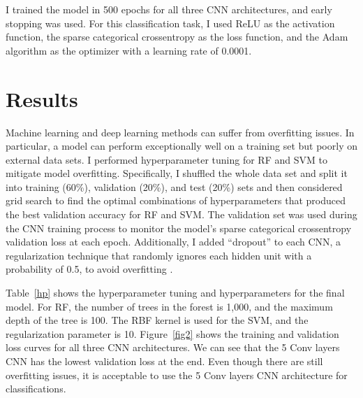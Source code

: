 \documentclass[letterpaper]{article} %
\begin{document}
I trained the model in 500 epochs for all three CNN architectures, and early stopping was used. For this classification task, I used ReLU as the activation function, the sparse categorical crossentropy as the loss function, and the Adam algorithm as the optimizer with a learning rate of 0.0001. 


\begin{table}[t]
\centering
{}
\caption{Hyperparameters tuning for random forest and support vector machine and hyperparameters for the final models}
\label{hp}
\end{table}

\section{Results}

Machine learning and deep learning methods can suffer from overfitting issues. In particular, a model can perform exceptionally well on a training set but poorly on external data sets. I performed hyperparameter tuning for RF and SVM to mitigate model overfitting. Specifically, I shuffled the whole data set and split it into training (60\%), validation (20\%), and test (20\%) sets and then considered grid search to find the optimal combinations of hyperparameters that produced the best validation accuracy for RF and SVM. The validation set was used during the CNN training process to monitor the model's sparse categorical crossentropy validation loss at each epoch. Additionally, I added ``dropout'' to each CNN, a regularization technique that randomly ignores each hidden unit with a probability of 0.5, to avoid overfitting \cite{hinton2012improving}. 

Table~\ref{hp} shows the hyperparameter tuning and hyperparameters for the final model. For RF, the number of trees in the forest is 1,000, and the maximum depth of the tree is 100. The RBF kernel is used for the SVM, and the regularization parameter is 10. Figure~\ref{fig2} shows the training and validation loss curves for all three CNN architectures. We can see that the 5 Conv layers CNN has the lowest validation loss at the end. Even though there are still overfitting issues, it is acceptable to use the 5 Conv layers CNN architecture for classifications.
\end{document}
